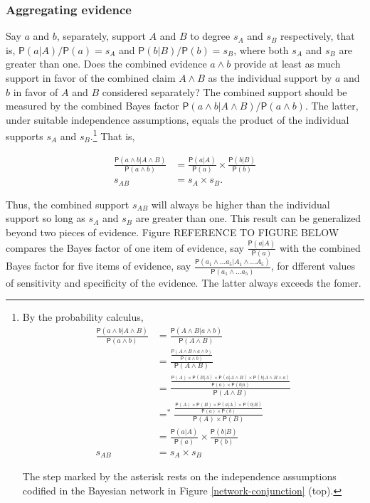 \documentclass[10pt,dvipsnames,enabledeprecatedfontcommands]{scrartcl}
\newcommand{\et}{\wedge}
\newcommand{\pr}[1]{\mathsf{P}(#1)}
\begin{document}
\subsubsection{Aggregating evidence}\label{aggregating-evidence}

Say \(a\) and \(b\), separately, support \(A\) and \(B\) to degree
\(s_A\) and \(s_B\) respectively, that is, \(\pr{a | A}/\pr{a}=s_A\) and
\(\pr{b | B}/\pr{b}=s_B\), where both \(s_A\) and \(s_B\) are greater
than one. Does the combined evidence \(a \wedge b\) provide at least as
much support in favor of the combined claim \(A \wedge B\) as the
individual support by \(a\) and \(b\) in favor of \(A\) and \(B\)
considered separately? The combined support should be measured by the
combined Bayes factor \(\pr{a \wedge b| A\wedge B}/\pr{a \wedge b}\).
The latter, under suitable independence assumptions, equals the product
of the individual supports \(s_{A}\) and
\(s_{B}\).\footnote{By the probability calculus,
 \begin{align*}
\frac{\pr{a \wedge b| A\wedge B}}{\pr{a \wedge b}} & =  \frac{\pr{A \et B| a\wedge b}}{\pr{A \et B}}\\
& =  \frac{\frac{ \pr{A \et B \et a \wedge b }}{\pr{a \et b}}}{\pr{A \et B}} \\ 
& =  \frac{\frac{ \pr{A} \times \pr{B|A} \times \pr{a | A \wedge B} \times \pr{b | A \wedge B \wedge a}}{\pr{a} \times \pr{b | a}}}{\pr{A \et B}} \\ 
& =^*  \frac{\frac{\pr{A} \times \pr{B} \times \pr{a | A} \times \pr{b | B}}{\pr{a} \times \pr{b}}}{\pr{A} \times \pr{B}} \\ 
& =  \frac{\pr{a |A}}{\pr{a}} \times \frac{\pr{b |B}}{\pr{b}} \\
s_{AB}& =  s_{A}\times s_{B} 
 \end{align*}

\noindent
The step marked by the asterisk rests on the 
independence assumptions codified in the Bayesian network 
in Figure \ref{network-conjunction} (top).} That is,

\begin{align*}
\frac{\pr{a \wedge b| A\wedge B}}{\pr{a \wedge b}} & =  \frac{\pr{a |A}}{\pr{a}} \times \frac{\pr{b |B}}{\pr{b}} \\
s_{AB}& =  s_{A}\times s_{B}.
 \end{align*}

\noindent  Thus, the combined support \(s_{AB}\) will always be higher
than the individual support so long as \(s_{A}\) and \(s_{B}\) are
greater than one. This result can be generalized beyond two pieces of
evidence. Figure REFERENCE TO FIGURE BELOW compares the Bayes factor of
one item of evidence, say \(\frac{\pr{a \vert A}}{\pr{a}}\) with the
combined Bayes factor for five items of evidence, say
\(\frac{\pr{a_1 \wedge \dots a_5 \vert A_1 \wedge \dots A_5}}{\pr{a_1\wedge \dots a_5}}\),
for dfferent values of sensitivity and specificity of the evidence. The
latter always exceeds the fomer.
\end{document}
